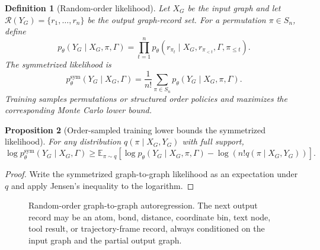 \documentclass[11pt]{article}
\newtheorem{definition}{Definition}[section]
\newtheorem{proposition}[definition]{Proposition}
\newcommand{\E}{\mathbb{E}}
\newcommand{\1}{\mathbf{1}}
\begin{document}
\begin{definition}[Random-order likelihood]
Let $X_G$ be the input graph and let $\mathcal R(Y_G)=\{r_1,\ldots,r_n\}$ be the output graph-record set. For a permutation $\pi\in S_n$, define
\[
  p_\theta(Y_G\mid X_G,\pi,\Gamma)=\prod_{t=1}^n p_\theta(r_{\pi_t}\mid X_G,r_{\pi_{<t}},\Gamma,\pi_{\le t}).
\]
The symmetrized likelihood is
\[
  p_\theta^{\mathrm{sym}}(Y_G\mid X_G,\Gamma)=\frac{1}{n!}\sum_{\pi\in S_n}p_\theta(Y_G\mid X_G,\pi,\Gamma).
\]
Training samples permutations or structured order policies and maximizes the corresponding Monte Carlo lower bound.
\end{definition}

\begin{proposition}[Order-sampled training lower bounds the symmetrized likelihood]
For any distribution $q(\pi\mid X_G,Y_G)$ with full support,
\[
\log p_\theta^{\mathrm{sym}}(Y_G\mid X_G,\Gamma)\geq
\E_{\pi\sim q}\left[\log p_\theta(Y_G\mid X_G,\pi,\Gamma)-\log(n!q(\pi\mid X_G,Y_G))\right].
\]
\end{proposition}
\begin{proof}
Write the symmetrized graph-to-graph likelihood as an expectation under $q$ and apply Jensen's inequality to the logarithm.\end{proof}

\begin{figure}[H]
\centering
{}
\caption{Random-order graph-to-graph autoregression. The next output record may be an atom, bond, distance, coordinate bin, text node, tool result, or trajectory-frame record, always conditioned on the input graph and the partial output graph.}
\label{fig:random}
\end{figure}
\end{document}

